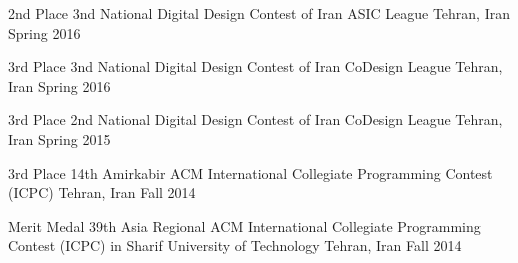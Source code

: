 \begin{cvhonors}

  \cvhonor
    {2nd Place} %
    {3nd National Digital Design Contest of Iran ASIC League} %
    {Tehran, Iran} %
    {Spring 2016} %

  \cvhonor
    {3rd Place} %
    {3nd National Digital Design Contest of Iran CoDesign League} %
    {Tehran, Iran} %
    {Spring 2016} %

  \cvhonor
    {3rd Place} %
    {2nd National Digital Design Contest of Iran CoDesign League} %
    {Tehran, Iran} %
    {Spring 2015} %

  \cvhonor
    {3rd Place} %
    {14th Amirkabir ACM International Collegiate Programming Contest (ICPC)} %
    {Tehran, Iran} %
    {Fall 2014} %

  \cvhonor
    {Merit Medal} %
    {39th Asia Regional ACM International Collegiate Programming Contest (ICPC) in Sharif University of Technology} %
    {Tehran, Iran} %
    {Fall 2014} %

\end{cvhonors}



